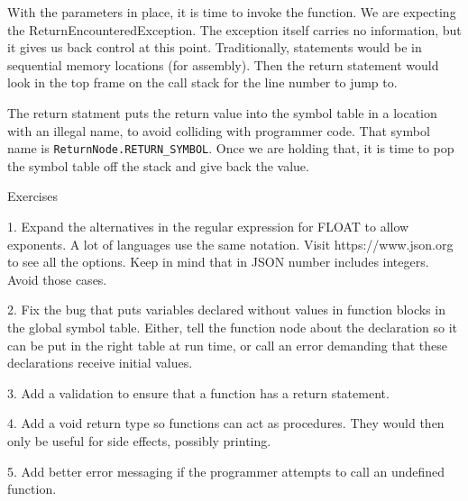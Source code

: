 With the parameters in place, it is time to invoke the function. We are expecting
the ReturnEncounteredException. The exception itself carries no information,
but it gives us back control at this point. Traditionally, statements would
be in sequential memory locations (for assembly). Then the return statement
would look in the top frame on the call stack for the line number to jump to.

The return statment puts the return value into the symbol table in a location
with an illegal name, to avoid colliding with programmer code. That symbol
name is \verb+ReturnNode.RETURN_SYMBOL+. Once we are holding that, it is time
to pop the symbol table off the stack and give back the value.

Exercises

1. Expand the alternatives in the regular expression for FLOAT to
   allow exponents. A lot of languages use the same notation.
   Visit https://www.json.org to see all the options. Keep in mind
   that in JSON number includes integers. Avoid those cases.

2. Fix the bug that puts variables declared without values in function blocks
   in the global symbol table. Either, tell the function node about
   the declaration so it can be put in the right table at run time,
   or call an error demanding that these declarations receive initial
   values.

3. Add a validation to ensure that a function has a return statement.

4. Add a void return type so functions can act as procedures. They
    would then only be useful for side effects, possibly printing.

5. Add better error messaging if the programmer attempts to call an
    undefined function.
